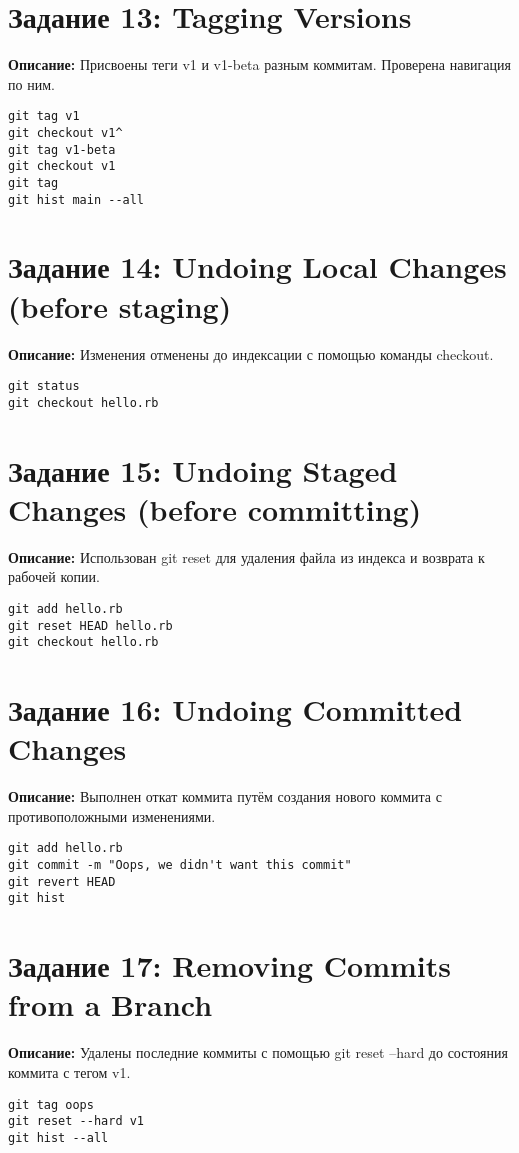 \documentclass[a4paper,12pt]{report}
\begin{document}
\section*{Задание 13: Tagging Versions}
\textbf{Описание:} Присвоены теги v1 и v1-beta разным коммитам. Проверена навигация по ним.
\begin{verbatim}
git tag v1
git checkout v1^
git tag v1-beta
git checkout v1
git tag
git hist main --all
\end{verbatim}

\section*{Задание 14: Undoing Local Changes (before staging)}
\textbf{Описание:} Изменения отменены до индексации с помощью команды checkout.
\begin{verbatim}
git status
git checkout hello.rb
\end{verbatim}

\section*{Задание 15: Undoing Staged Changes (before committing)}
\textbf{Описание:} Использован git reset для удаления файла из индекса и возврата к рабочей копии.
\begin{verbatim}
git add hello.rb
git reset HEAD hello.rb
git checkout hello.rb
\end{verbatim}

\section*{Задание 16: Undoing Committed Changes}
\textbf{Описание:} Выполнен откат коммита путём создания нового коммита с противоположными изменениями.
\begin{verbatim}
git add hello.rb
git commit -m "Oops, we didn't want this commit"
git revert HEAD
git hist
\end{verbatim}

\section*{Задание 17: Removing Commits from a Branch}
\textbf{Описание:} Удалены последние коммиты с помощью git reset --hard до состояния коммита с тегом v1.
\begin{verbatim}
git tag oops
git reset --hard v1
git hist --all
\end{verbatim}
\end{document}
